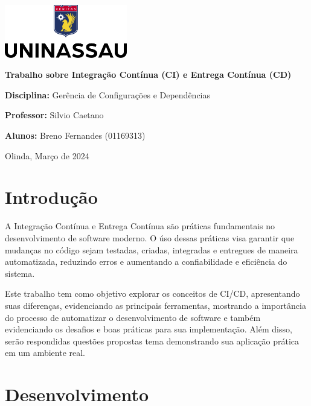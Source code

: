 \documentclass[a4paper,12pt]{article}
\begin{document}
\begin{titlepage}
    \centering
    \includegraphics[width=0.4\textwidth]{./media/uninassau-logo.png}\par\vspace{1cm}
    
    {\huge\bfseries Trabalho sobre Integração Contínua (CI) e Entrega Contínua (CD)\par}\vspace{1cm}
    
    \textbf{Disciplina:} Gerência de Configurações e Dependências\par
    \textbf{Professor:} Silvio Caetano\par
    \textbf{Alunos:} Breno Fernandes (01169313)\par
    
    \vfill
    
    {\large Olinda, Março de 2024\par}
\end{titlepage}

\pagestyle{fancy}
\fancyhf{}
\fancyfoot[R]{\thepage}

\newpage

\section*{Introdução}
A Integração Contínua e Entrega Contínua são práticas fundamentais no desenvolvimento de software moderno. O úso dessas práticas visa garantir que mudanças no código sejam testadas, criadas, integradas e entregues de maneira automatizada, reduzindo erros e aumentando a confiabilidade e eficiência do sistema.  

Este trabalho tem como objetivo explorar os conceitos de CI/CD, apresentando suas diferenças, evidenciando as principais ferramentas, mostrando a importância do processo de automatizar o desenvolvimento de software e também evidenciando os desafios e boas práticas para sua implementação. Além disso, serão respondidas questões propostas tema demonstrando sua aplicação prática em um ambiente real.
\newpage{}
\section*{Desenvolvimento}
\end{document}
